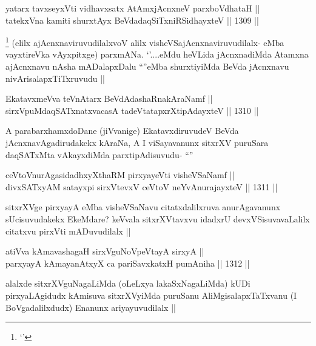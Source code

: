 \begin{shl}
yatarx tavxseyxVti vidhavxsatx AtAmxjAcnxneV parxboVdhataH || \\
tatekxVna kamiti shurxtAyx BeVdadaqSiTxniRSidhayxteV ||  1309 ||  
\end{shl}

\begin{artha}
\footnote{`\stext'}
(elilx ajAcnxnaviruvudilalxvoV alilx visheVSajAcnxnaviruvudilalx- eMba vayxtireVka vAyxpitxge) parxmANa. `\stext'....eMdu heVLida jAcnxnadiMda Atamxna ajAcnxnavu nAsha mADalapxDalu ``\stext''eMba shurxtiyiMda BeVda jAcnxnavu nivArisalapxTiTxruvudu ||
\end{artha}


\begin{shl}
EkatavxmeVva teVnAtarx BeVdAdashaRnakAraNamf || \\
sirxVpuMdaqSATxnatxvacasA tadeVtatapxrXtipAdayxteV ||  1310 ||  
\end{shl}

\begin{artha}
A parabarxhamxdoDane (jiVvanige) EkatavxdiruvudeV BeVda jAcnxnavAgadirudakekx kAraNa, A I viSayavanunx sitxrXV puruSara daqSATxMta vAkayxdiMda parxtipAdisuvudu- ``\stext''
\end{artha}


\begin{shl}
ceVtoVnurAgasidadhxyXthaRM pirxyayeVti visheVSaNamf || \\
divxSATxyAM satayxpi sirxVtevxV ceVtoV neYvAnurajayxteV ||  1311 ||  
\end{shl}

\begin{artha}
sitxrXVge pirxyayA eMba visheVSaNavu citatxdalilxruva anurAgavanunx sUcisuvudakekx EkeMdare? keVvala sitxrXVtavxvu idadxrU devxVSisuvavaLalilx citatxvu pirxVti mADuvudilalx ||
\end{artha}

\begin{shl}
atiVva kAmavashagaH sirxVguNoVpeVtayA sirxyA || \\
parxyayA kAmayanAtxyX ca pariSavxkatxH pumAniha ||  1312 ||  
\end{shl}

\begin{artha}
alalxde sitxrXVguNagaLiMda (oLeLxya lakaSxNagaLiMda) kUDi pirxyaLAgidudx kAmisuva sitxrXVyiMda puruSanu AliMgisalapxTaTxvanu (I BoVgadalilxdudx) Enanunx ariyayuvudilalx ||
\end{artha}

